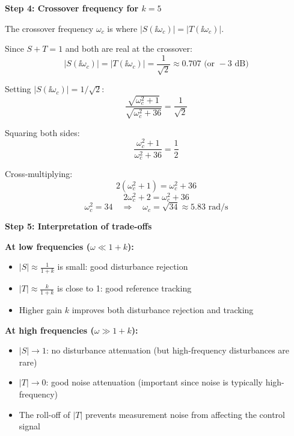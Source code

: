 \documentclass[11pt,a4paper]{article}
\begin{document}
\textbf{Step 4: Crossover frequency for $k = 5$}

The crossover frequency $\omega_c$ is where $|S(\ii\omega_c)| = |T(\ii\omega_c)|$.

Since $S + T = 1$ and both are real at the crossover:
\begin{equation}
  |S(\ii\omega_c)| = |T(\ii\omega_c)| = \frac{1}{\sqrt{2}} \approx 0.707 \text{ (or } -3 \text{ dB)}
\end{equation}

Setting $|S(\ii\omega_c)| = 1/\sqrt{2}$:
\begin{equation}
  \frac{\sqrt{\omega_c^2 + 1}}{\sqrt{\omega_c^2 + 36}} = \frac{1}{\sqrt{2}}
\end{equation}

Squaring both sides:
\begin{equation}
  \frac{\omega_c^2 + 1}{\omega_c^2 + 36} = \frac{1}{2}
\end{equation}

Cross-multiplying:
\begin{equation}
  2(\omega_c^2 + 1) = \omega_c^2 + 36
\end{equation}
\begin{equation}
  2\omega_c^2 + 2 = \omega_c^2 + 36
\end{equation}
\begin{equation}
  \omega_c^2 = 34 \quad \Rightarrow \quad \omega_c = \sqrt{34} \approx 5.83 \text{ rad/s}
\end{equation}

\textbf{Step 5: Interpretation of trade-offs}

\textbf{At low frequencies ($\omega \ll 1+k$):}
\begin{itemize}
  \item $|S| \approx \frac{1}{1+k}$ is small: good disturbance rejection
  \item $|T| \approx \frac{k}{1+k}$ is close to 1: good reference tracking
  \item Higher gain $k$ improves both disturbance rejection and tracking
\end{itemize}

\textbf{At high frequencies ($\omega \gg 1+k$):}
\begin{itemize}
  \item $|S| \to 1$: no disturbance attenuation (but high-frequency disturbances are rare)
  \item $|T| \to 0$: good noise attenuation (important since noise is typically high-frequency)
  \item The roll-off of $|T|$ prevents measurement noise from affecting the control signal
\end{itemize}
\end{document}
